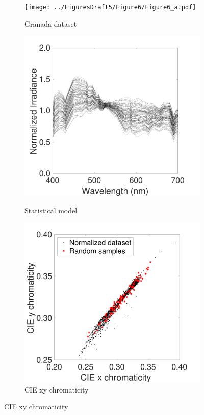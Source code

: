 \documentclass{jov}
\begin{document}
\begin{figure}
\centering
    \begin{subfigure}[b]{0.24 \textwidth}
    \centering
	\caption{Granada dataset}
        \texttt{[image: ../FiguresDraft5/Figure6/Figure6\_a.pdf]}
        \label{fig:granadaData}
    \end{subfigure}
	\begin{subfigure}[b]{0.24 \textwidth}
    \centering
        \caption{Statistical model}
        \includegraphics[width=\textwidth]{../FiguresDraft5/Figure6/Figure6_b.pdf}
        \label{fig:illuminantSamples}
    \end{subfigure}
      	\begin{subfigure}[b]{0.24 \textwidth}
    \centering
        \caption{CIE xy chromaticity}
        \includegraphics[width=\textwidth]{../FiguresDraft5/Figure6/Figure6_c.pdf}

\end{subfigure}
\end{figure}
\end{document}
